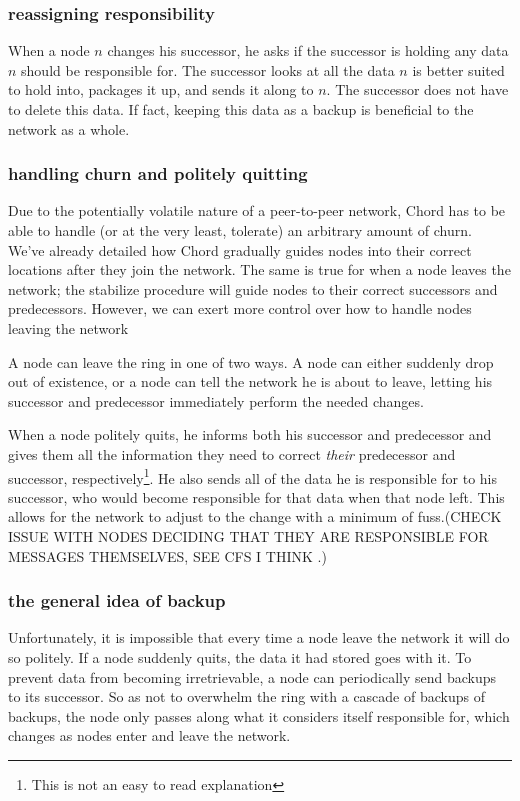 \documentclass[conference, compsocconf, letterpaper]{IEEEtran}
\begin{document}
\subsubsection{reassigning responsibility}
When a node $n$ changes his successor, he asks if the successor is holding any data $n$ should be responsible for.  The successor looks at all the data $n$ is better suited to hold into, packages it up, and sends it along to $n$.  The successor does not have to delete this data. If fact, keeping this data as a backup is beneficial to the network as a whole. 

\subsubsection{handling churn and politely quitting}
Due to the potentially volatile nature of a peer-to-peer network, Chord has to be able to handle (or at the very least, tolerate) an arbitrary amount of churn.  We've already detailed how Chord gradually guides nodes into their correct locations after they join the network.  The same is true for when a node leaves the network; the stabilize procedure will guide nodes to their correct successors and predecessors.  However, we can exert more control over how to handle nodes leaving the network

A node can leave the ring in one of two ways.  A node can either suddenly drop out of existence, or a node can tell the network he is about to leave, letting his successor and predecessor immediately perform the needed changes.

When a node politely quits, he informs both his successor and predecessor and gives them all the information they need to correct \emph{their} predecessor and successor, respectively\footnote{This is not an easy to read explanation}. He also sends all of the data he is responsible for to his successor, who would become responsible for that data when that node left.  This allows for the network to adjust to the change with a minimum of fuss.(CHECK ISSUE WITH NODES DECIDING THAT THEY ARE RESPONSIBLE FOR MESSAGES THEMSELVES, SEE CFS I THINK .) 

\subsubsection{the general idea of backup}
Unfortunately, it is impossible that every time a node leave the network it will do so politely.  If a node suddenly quits, the data it had stored goes with it. To prevent data from becoming irretrievable, a node can periodically send backups to its successor.  So as not to overwhelm the ring with a cascade of backups of backups, the node only passes along what it considers itself responsible for, which changes as nodes enter and leave the network.
\end{document}

